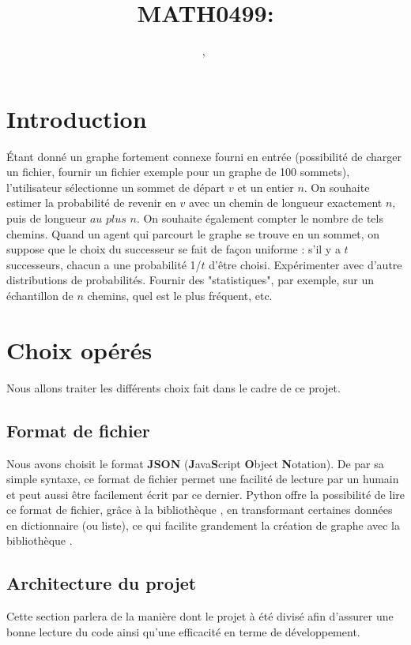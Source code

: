 \documentclass[a4paper, 11pt, oneside]{article}
\title{MATH0499: \intitule}
\author{\PrenomUN~\textsc{\NomUN}, \PrenomDEUX~\textsc{\NomDEUX}}
\date{}
\newcommand{\tablemat}{~}
\renewcommand{\tablemat}{\tableofcontents}
\begin{document}
	\maketitle
	\newpage
	\tablemat
	\newpage
	

	
	\section{Introduction}
	Étant donné un graphe fortement connexe fourni en entrée (possibilité de charger un fichier, fournir un fichier exemple pour un graphe de 100 sommets), l'utilisateur sélectionne un sommet de départ $v$ et un entier $n$. On souhaite estimer la probabilité de revenir en $v$ avec un chemin de longueur exactement $n$, puis de longueur $au$ $plus$ $n$. On souhaite également compter le nombre de tels chemins. Quand un agent qui parcourt le graphe se trouve en un sommet, on suppose que le choix du successeur se fait de façon uniforme : s'il y a $t$ successeurs, chacun a une probabilité 1/$t$ d'être choisi. Expérimenter avec d'autre distributions de probabilités. Fournir des "statistiques", par exemple, sur un échantillon de $n$ chemins, quel est le plus fréquent, etc.
	
		
	\section{Choix opérés}
	Nous allons traiter les différents choix fait dans le cadre de ce projet.
	
	\subsection{Format de fichier}
	Nous avons choisit le format \textbf{JSON} (\textbf{J}ava\textbf{S}cript \textbf{O}bject \textbf{N}otation). De par sa simple syntaxe, ce format de fichier permet une facilité de lecture par un humain et peut aussi être facilement écrit par ce dernier. Python offre la possibilité de lire ce format de fichier, grâce à la bibliothèque , en transformant certaines données en dictionnaire (ou liste), ce qui facilite grandement la création de graphe avec la bibliothèque . 
	
	\subsection{Architecture du projet}
	Cette section parlera de la manière dont le projet à été divisé afin d'assurer une bonne lecture du code ainsi qu'une efficacité en terme de développement.
	
\end{document}
